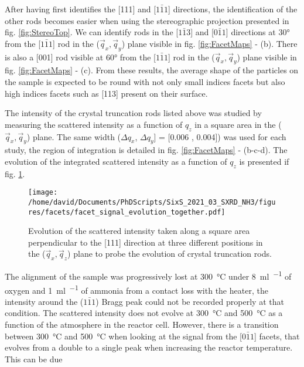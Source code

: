 After having first identifies the [111] and [$1\bar{1}1$] directions, the identification of the other rods becomes easier when using the stereographic projection presented in fig. \ref{fig:StereoTop}.
We can identify rods in the [$1\bar{1}3$] and [$0\bar{1}1$] directions at \ang{30} from the [$1\bar{1}1$] rod in the ($\vec{q}_x, \vec{q}_y$) plane visible in fig. \ref{fig:FacetMaps} - (b).
There is also a [001] rod visible at \ang{60} from the [$1\bar{1}1$] rod in the ($\vec{q}_x, \vec{q}_y$) plane visible in fig. \ref{fig:FacetMaps} - (c).
From these results, the average shape of the particles on the sample is expected to be round with not only small indices facets but also high indices facets such as [113] present on their surface.

The intensity of the crystal truncation rods listed above was studied by measuring the scattered intensity as a function of $q_z$ in a square area in the ($\vec{q}_x, \vec{q}_y$) plane.
The same width ($\Delta q_x$, $\Delta q_y$] = [0.006 , 0.004]) was used for each study, the region of integration is detailed in fig. \ref{fig:FacetMaps} - (b-c-d).
The evolution of the integrated scattered intensity as a function of $q_z$ is presented if fig. \ref{fig:FacetSignal}.

\begin{figure}[!htb]
    \centering
    \texttt{[image: /home/david/Documents/PhDScripts/SixS\_2021\_03\_SXRD\_NH3/figures/facets/facet\_signal\_evolution\_together.pdf]}
    \caption{
    Evolution of the scattered intensity taken along a square area perpendicular to the [111] direction at three different positions in the ($\vec{q}_x, \vec{q}_z$) plane to probe the evolution of crystal truncation rods.
    }
    \label{fig:FacetSignal}
\end{figure}

The alignment of the sample was progressively lost at \qty{300}{\degreeCelsius} under \qty{8}{\ml\per\min} of oxygen and \qty{1}{\ml\per\min} of ammonia from a contact loss with the heater, the intensity around the ($1\bar{1}1$) Bragg peak could not be recorded properly at that condition.
The scattered intensity does not evolve at \qty{300}{\degreeCelsius} and \qty{500}{\degreeCelsius} as a function of the atmosphere in the reactor cell.
However, there is a transition between \qty{300}{\degreeCelsius} and \qty{500}{\degreeCelsius} when looking at the signal from the [$0\bar{1}1$] facets, that evolves from a double to a single peak when increasing the reactor temperature.
This can be due


